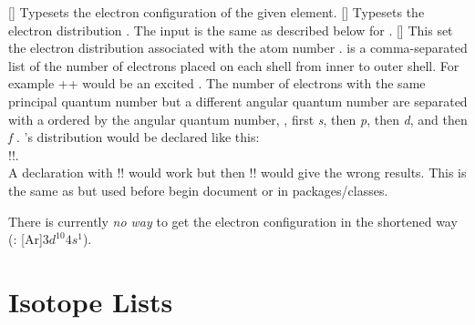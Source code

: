 \documentclass[load-preamble+]{cnltx-doc}
\begin{document}
\begin{commands}
  []
    Typesets the electron configuration of the given element.
  []
    Typesets the electron distribution .  The
    input is the same as described below for .
  []
     This set the electron distribution associated with the atom number
     .   is a comma-separated
     list of the number of electrons placed on each shell from inner to outer
     shell.  For example \verbcode++ would
     be an excited .   The number of electrons with the same
     principal quantum number but a different angular quantum number are
     separated with a \code{+} ordered by the angular quantum number, \ie,
     first \emph{s}, then \emph{p}, then \emph{d}, and then \emph{f} .
     ’s distribution would be declared like this: \\
     \verbcode!!. \\
     A declaration with \verbcode!!
     would work but then \verbcode!! would give the wrong results.
    This is the same as  but used before begin
    document or in packages/classes. 
\end{commands}

\begin{example}
   \par
\end{example}

There is currently \emph{no way} to get the electron configuration in the
shortened way (\eg: [Ar]$3d^{10}4s^1$).

\section{Isotope Lists}
\end{document}

